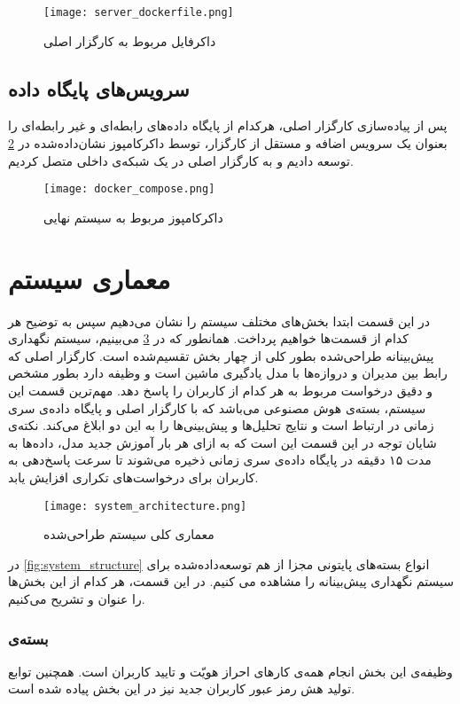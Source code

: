 \begin{figure}[!h]
\centerline{\texttt{[image: server\_dockerfile.png]}}
\caption{داکرفایل مربوط به کارگزار اصلی}
\label{fig:server_dockerfile}
\end{figure}

\subsection{سرویس‌های پایگاه داده}
پس از پیاده‌سازی کارگزار اصلی، هرکدام از پایگاه‌ داده‌های رابطه‌ای و غیر رابطه‌ای را بعنوان یک سرویس اضافه و مستقل از کارگزار، توسط داکرکامپوز نشان‌داده‌‌شده در \cref{fig:docker_compose} توسعه دادیم و به کارگزار اصلی در یک شبکه‌ی داخلی متصل کردیم.

\begin{figure}[!h]
\centerline{\texttt{[image: docker\_compose.png]}}
\caption{داکرکامپوز مربوط به سیستم نهایی}
\label{fig:docker_compose}
\end{figure}


\section{معماری سیستم}
در این قسمت ابتدا بخش‌های مختلف سیستم را نشان می‌دهیم سپس به توضیح هر کدام از قسمت‌ها خواهیم پرداخت. همانطور که در \cref{fig:system_architecture} می‌بینیم، سیستم نگهداری پیش‌بینانه طراحی‌شده بطور کلی از چهار بخش تقسیم‌شده است. کارگزار اصلی که رابط بین مدیران و دروازه‌ها با مدل یادگیری ماشین است و وظیفه‌ دارد بطور مشخص و دقیق درخواست مربوط به هر کدام از کاربران را پاسخ دهد. مهم‌ترین قسمت این سیستم، بسته‌ی هوش مصنوعی می‌باشد که با کارگزار اصلی و پایگاه‌ داده‌ی سری زمانی در ارتباط است و نتایج تحلیل‌ها و پیش‌بینی‌ها را به این دو ابلاغ می‌کند. نکته‌ی شایان توجه در این قسمت این است که به ازای هر بار آموزش جدید مدل، داده‌ها به مدت ۱۵ دقیقه در پایگاه‌ داده‌ی سری زمانی ذخیره می‌شوند تا سرعت پاسخ‌دهی به کاربران برای درخواست‌های تکراری افزایش یابد.

\begin{figure}[!h]
\centerline{\texttt{[image: system\_architecture.png]}}
\caption{معماری کلی سیستم طراحی‌شده}
\label{fig:system_architecture}
\end{figure}


در \cref{fig:system_structure} انواع بسته‌های پایتونی مجزا از هم توسعه‌داده‌شده برای سیستم نگهداری پیش‌بینانه را مشاهده می کنیم. در این قسمت، هر کدام از این بخش‌ها را عنوان و تشریح می‌کنیم.

\subsubsection{بسته‌ی }
وظیفه‌ی این بخش انجام همه‌ی کارهای احراز هویّت و تایید کاربران است. همچنین توابع تولید هش رمز عبور کاربران جدید نیز در این بخش پیاد‌ه ‌شده است.

